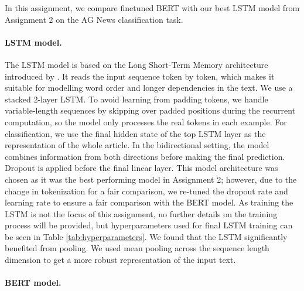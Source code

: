 In this assignment, we compare finetuned BERT with our best LSTM model from Assignment 2 on the AG News classification task.

\paragraph{LSTM model.}
The LSTM model is based on the Long Short-Term Memory architecture introduced by \cite{hochreiter1997lstm}. It reads the input sequence token by token, which makes it suitable for modelling word order and longer dependencies in the text. We use a stacked 2-layer LSTM. To avoid learning from padding tokens, we handle variable-length sequences by skipping over padded positions during the recurrent computation, so the model only processes the real tokens in each example. For classification, we use the final hidden state of the top LSTM layer as the representation of the whole article. In the bidirectional setting, the model combines information from both directions before making the final prediction. Dropout is applied before the final linear layer. This model architecture was chosen as it was the best performing model in Assignment 2; however, due to the change in tokenization for a fair comparison, we re-tuned the dropout rate and learning rate to ensure a fair comparison with the BERT model. As training the LSTM is not the focus of this assignment, no further details on the training process will be provided, but hyperparameters used for final LSTM training can be seen in Table \ref{tab:hyperparameters}. We found that the LSTM significantly benefited from pooling. We used mean pooling across the sequence length dimension to get a more robust representation of the input text.

\paragraph{BERT model.}

